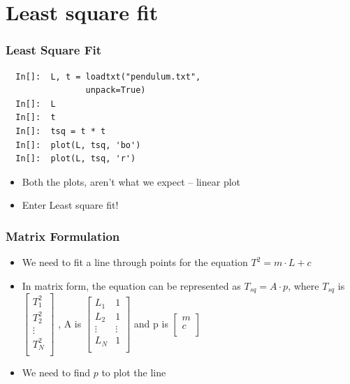 \section{Least square fit}

\begin{frame}[fragile]
  \frametitle{Least Square Fit}
  \begin{lstlisting}
  In[]:  L, t = loadtxt("pendulum.txt", 
                unpack=True)
  In[]:  L
  In[]:  t
  In[]:  tsq = t * t
  In[]:  plot(L, tsq, 'bo')
  In[]:  plot(L, tsq, 'r')
  \end{lstlisting}
  \begin{itemize}
  \item Both the plots, aren't what we expect -- linear plot
  \item Enter Least square fit!
  \end{itemize}
\end{frame}

\begin{frame}[fragile]
  \frametitle{Matrix Formulation}
  \begin{itemize}
  \item We need to fit a line through points for the equation $T^2 = m \cdot L+c$
  \item In matrix form, the equation can be represented as $T_{sq} = A \cdot p$, where $T_{sq}$ is
    $\begin{bmatrix}
    T^2_1 \\
    T^2_2 \\
    \vdots\\
    T^2_N \\
  \end{bmatrix}$
    , A is   
    $\begin{bmatrix}
    L_1 & 1 \\
    L_2 & 1 \\
    \vdots & \vdots\\
    L_N & 1 \\
  \end{bmatrix}$
    and p is 
    $\begin{bmatrix}
      m\\
      c\\
    \end{bmatrix}$
  \item We need to find $p$ to plot the line
  \end{itemize}
\end{frame}

